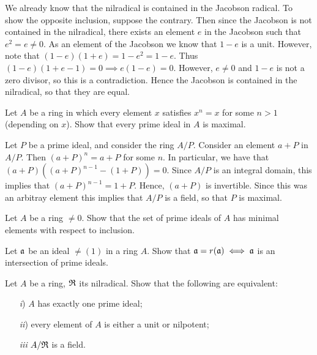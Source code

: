 \documentclass[10pt]{amsart}
\begin{document}
\begin{solution}
    We already know that the nilradical is contained in the Jacobson radical. 
    To show the opposite inclusion, suppose the contrary. Then since the Jacobson 
    is not contained in the nilradical, there exists an element $e$ in the Jacobson such 
    that $e^2 = e \ne 0$. As an element of the Jacobson we know that 
    $1 - e$ is a unit. However, note that $(1 - e)(1 + e) = 1 - e^2 = 1 - e$. 
    Thus $(1 - e)(1 + e - 1) = 0 \implies e(1 - e) = 0$. However, $e \ne 0$ and 
    $1 - e$ is not a zero divisor, so this is a contradiction. Hence the Jacobson is 
    contained in the nilradical, so that they are equal. 
\end{solution}

\begin{exercise}
    Let $A$ be a ring in which every element $x$ satisfies $x^n = x$ for some $n > 1$ (depending on $x$). Show that every prime ideal in $A$ 
    is maximal.
\end{exercise}

\begin{solution}
    Let $P$ be a prime ideal, and consider the ring $A/P$. Consider an element 
    $a + P$ in $A/P$. Then $(a + P)^n = a + P$ for some $n$. In particular, we have that 
    $(a + P)((a + P)^{n-1} - (1 + P)) = 0$. Since $A/P$ is an integral domain, this implies that 
    $(a + P)^{n-1} = 1 + P$. Hence, $(a + P)$ is invertible. Since this was an arbitray element 
    this implies that $A/P$ is a field, so that $P$ is maximal.
\end{solution}

\begin{exercise}
    Let $A$ be a ring $\ne 0$. Show that the set of prime ideals of $A$ has minimal 
    elements with respect to inclusion.
\end{exercise}

\begin{exercise}
    Let $\mathfrak{a}$ be an ideal $\ne (1)$ in a ring $A$. Show that 
    $\mathfrak{a} = r(\mathfrak{a}) \iff \mathfrak{a}$ is an intersection of prime ideals.
\end{exercise}

\begin{exercise}
    Let $A$ be a ring, $\mathfrak{R}$ its nilradical. Show that the following are equivalent: 
    \begin{itemize}
        \item[\emph{i})] $A$ has exactly one prime ideal;
        \item[\emph{ii})] every element of $A$ is either a unit or nilpotent; 
        \item[\emph{iii}] $A/\mathfrak{R}$ is a field.    
    \end{itemize}
\end{exercise}
\end{document}
